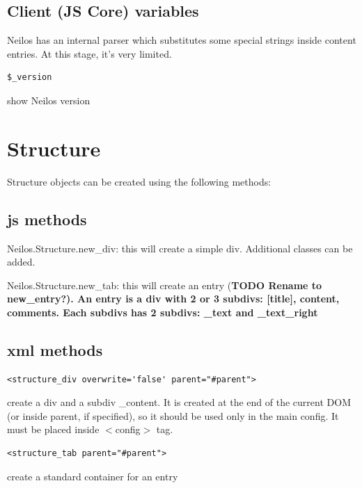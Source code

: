 \documentclass[a4paper,12pt]{article}
\begin{document}
\subsection{Client (JS Core) variables}
Neilos has an internal parser which substitutes some special strings inside content entries. At this stage, it's very limited.
\begin{list}{-}{}
\item \begin{verbatim}
$_version
\end{verbatim}
show Neilos version
\end{list}
\normalsize
\section{Structure}
Structure objects can be created using the following methods:
\subsection{js methods}
\begin{list}{-}{}
 \item Neilos.Structure.new\_div: this will create a simple div. Additional classes can be added.
\item Neilos.Structure.new\_tab: this will create an entry (\bfseries{TODO} \normalfont Rename to new\_entry?). An entry is a div with 2 or 3 subdivs: [title], content, comments. Each subdivs has 2 subdivs: \_text and \_text\_right
\end{list}
\subsection{xml methods}
\begin{list}{-}{}
  \item \begin{verbatim}
<structure_div overwrite='false' parent="#parent">         
        \end{verbatim}
create a div and a subdiv \_content. It is created at the end of the current DOM (or inside parent, if specified), so it should be used only in the main config. It must be placed inside $<$config$>$ tag.
  \item \begin{verbatim}
<structure_tab parent="#parent">         
        \end{verbatim}
create a standard container for an entry
\end{list}
\end{document}
